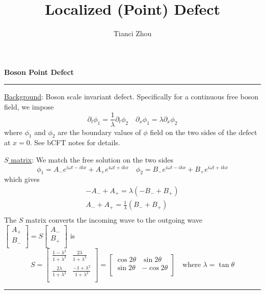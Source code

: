 \documentclass{article}
\title{Localized (Point) Defect}
\author{Tianci Zhou}
\begin{document}
\maketitle
\large

{\bf Boson Point Defect}

\noindent\rule{\linewidth}{0.4pt}

\underline{Background}: Boson scale invariant defect. Specifically for a continuous free boson field, we impose
\begin{equation}
\partial_t \phi_1 = \frac{1}{\lambda} \partial_t \phi_2 \quad \partial_x \phi_1 = \lambda \partial_x \phi_2 
\end{equation}
where $\phi_1$ and $\phi_2$ are the boundary values of $\phi$ field on the two sides of the defect at $x = 0$. See bCFT notes for details. 

\underline{$S$ matrix}: We match the free solution on the two sides
\begin{equation}
\phi_1 = A_{-} e^{i \omega t - i k x } + A_{+} e^{i \omega t + ikx } \quad \phi_2 = B_{-} e^{i \omega t - i k x } + B_{+} e^{i \omega t + ikx }
\end{equation}
which gives
\begin{equation}
\begin{aligned}
- A_{-} + A_{+} =\lambda (  - B_{-} +  B_{+} ) \\
A_{-} + A_{+} = \frac{1}{\lambda} (B_{-} + B_{+}) \\
\end{aligned}
\end{equation}
The $S$ matrix converts the incoming wave to the outgoing wave $\begin{bmatrix} A_{+}\\ B_{-}\\ \end{bmatrix} = S \begin{bmatrix} A_{-}\\ B_{+}\\ \end{bmatrix}$  is 
\begin{equation}
S = 
\begin{bmatrix}
\frac{1 - \lambda^2}{1 + \lambda^2} & \frac{2\lambda }{1 + \lambda^2} \\
\frac{2\lambda }{1 + \lambda^2} & \frac{-1 + \lambda^2}{1 + \lambda^2} \\
\end{bmatrix}
 = 
\begin{bmatrix}
\cos 2\theta & \sin 2\theta \\
\sin 2\theta & - \cos2  \theta \\
\end{bmatrix}
\quad \text{where } \lambda = \tan \theta 
\end{equation}
\noindent\rule{\linewidth}{0.4pt}
\end{document}
